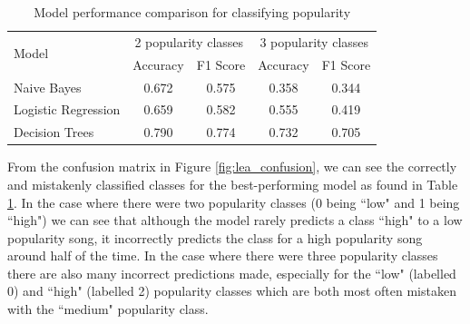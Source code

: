 \documentclass{article}
\begin{document}
\begin{table}[htbp]
    \centering
    \small
    \caption{Model performance comparison for classifying popularity}
    \label{tab:lea_model_comparison}
    \begin{tabular}{lcccc}
        \toprule
        \multirow{2}{*}{Model} & \multicolumn{2}{c}{2 popularity classes} & \multicolumn{2}{c}{3 popularity classes} \\
        \cmidrule(lr){2-3} \cmidrule(lr){4-5}
         & Accuracy & F1 Score & Accuracy & F1 Score \\
        \midrule
        Naive Bayes & 0.672 & 0.575 & 0.358 & 0.344 \\
        Logistic Regression & 0.659 & 0.582 & 0.555 & 0.419 \\
        Decision Trees & 0.790 & 0.774 & 0.732 & 0.705 \\
        \bottomrule
    \end{tabular}
\end{table}

From the confusion matrix in Figure \ref{fig:lea_confusion}, we can see the correctly and mistakenly classified classes for the best-performing model as found in Table \ref{tab:lea_model_comparison}. In the case where there were two popularity classes (0 being ``low" and 1 being ``high") we can see that although the model rarely predicts a class ``high" to a low popularity song, it incorrectly predicts the class for a high popularity song around half of the time. In the case where there were three popularity classes there are also many incorrect predictions made, especially for the ``low" (labelled 0) and ``high" (labelled 2) popularity classes which are both most often mistaken with the ``medium" popularity class.
\end{document}
